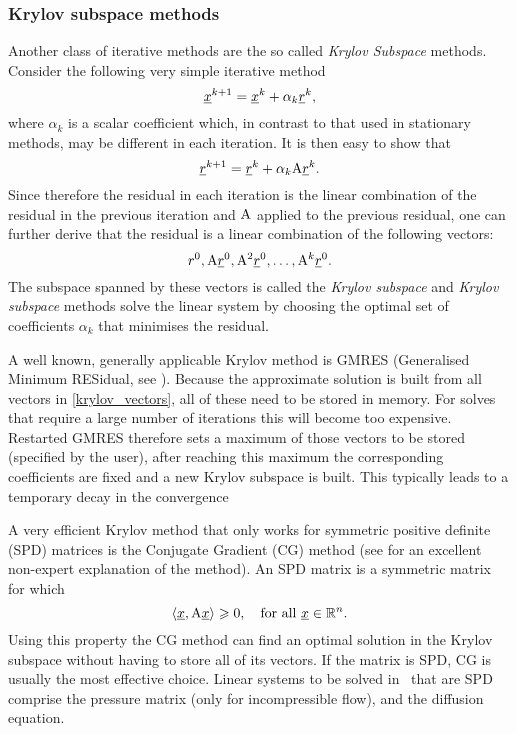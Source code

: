 \subsubsection{Krylov subspace methods} \label{sec:krylov_subspace_methods}
Another class of iterative methods are the so called 
\emph{Krylov Subspace} methods. Consider the following very 
simple iterative method
\begin{equation*}
  \underline{x}^{k+1}=\underline{x}^k + \alpha_k \underline{r}^k,
\end{equation*}
where $\alpha_k$ is a scalar coefficient which, 
in contrast to that used in stationary methods, may be different in each 
iteration. It is then easy to show that
\begin{equation*}
  \underline{r}^{k+1}=\underline{r}^k+\alpha_k \mathrm{A}\underline{r}^k.
\end{equation*}
Since therefore the residual in each iteration is the linear 
combination of the residual in the previous iteration and $\mathrm{A}$ 
applied to the previous residual, one can further derive that the 
residual is a linear combination of the following vectors:
\begin{equation}\label{krylov_vectors}
  r^0, \mathrm{A}\underline{r}^{0}, \mathrm{A}^2\underline{r}^0, \ldots, \mathrm{A}^k\underline{r}^0.
\end{equation}
The subspace spanned by these vectors is called the \emph{Krylov subspace} 
and \emph{Krylov subspace} methods solve the linear system by choosing 
the optimal set of coefficients $\alpha_k$ that minimises the residual.

A well known, generally applicable Krylov method is GMRES 
(Generalised Minimum RESidual, see \citet{saad1993}). Because the approximate solution 
is built from all vectors in \eqref{krylov_vectors}, all of these need
to be stored in memory. For solves that require a large number of 
iterations this will become too expensive. Restarted GMRES therefore sets
a maximum of those vectors to be stored (specified by the user), 
after reaching this maximum the corresponding coefficients are fixed 
and a new Krylov subspace is built. This typically leads to a 
temporary decay in the convergence

A very efficient Krylov method that only works for symmetric 
positive definite (SPD) matrices is the Conjugate 
Gradient (CG) method (see \citet{shewchuk1994} for 
an excellent non-expert explanation of the 
method). An SPD matrix is a symmetric matrix for which
\begin{equation*}
  \langle \underline{x}, \mathrm{A}\underline{x}\rangle \geqslant 0, \quad \text{for all }\underline{x}\in\mathbb{R}^n.
\end{equation*}
Using this property the CG method can find an optimal solution 
in the Krylov subspace without having to store all of its 
vectors. If the matrix is SPD, CG is usually the most 
effective choice. Linear systems to be solved in \fluidity\ that are SPD 
comprise the pressure matrix (only for incompressible flow), and the 
diffusion equation.

